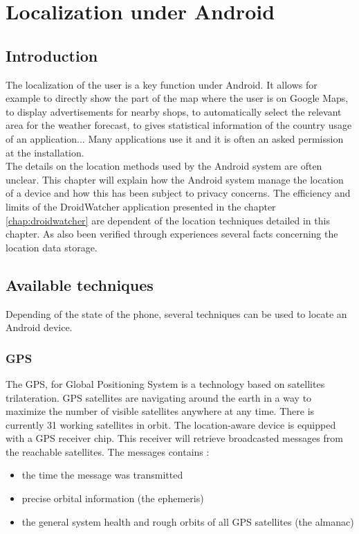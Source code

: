\chapter{Localization under Android}
\label{chap:and-loc}

\section*{Introduction}
The localization of the user is a key function under Android.
It allows for example to directly show the part of the map where the user is on Google Maps, to display advertisements for nearby shops, to automatically select the relevant area for the weather forecast, to gives statistical information of the country usage of an application...
Many applications use it and it is often an asked permission at the installation.\\

The details on the location methods used by the Android system are often unclear.
This chapter will explain how the Android system manage the location of a device and how this has been subject to privacy concerns.
The efficiency and limits of the DroidWatcher application presented in the chapter \ref{chap:droidwatcher} are dependent of the location techniques detailed in this chapter.
As also been verified through experiences several facts concerning the location data storage.

\section{Available techniques}
Depending of the state of the phone, several techniques can be used to locate an Android device.

\subsection{GPS}
\label{sec:loc-gps}

The GPS, for Global Positioning System is a technology based on satellites trilateration\cite{pocketgpsworld}.
GPS satellites are navigating around the earth in a way to maximize the number of visible satellites anywhere at any time.
There is currently 31 working satellites in orbit.
The location-aware device is equipped with a GPS receiver chip.
This receiver will retrieve broadcasted messages from the reachable satellites.
The messages contains :

\begin{itemize}
\item the time the message was transmitted
\item precise orbital information (the ephemeris)
\item the general system health and rough orbits of all GPS satellites (the almanac)
\end{itemize}

